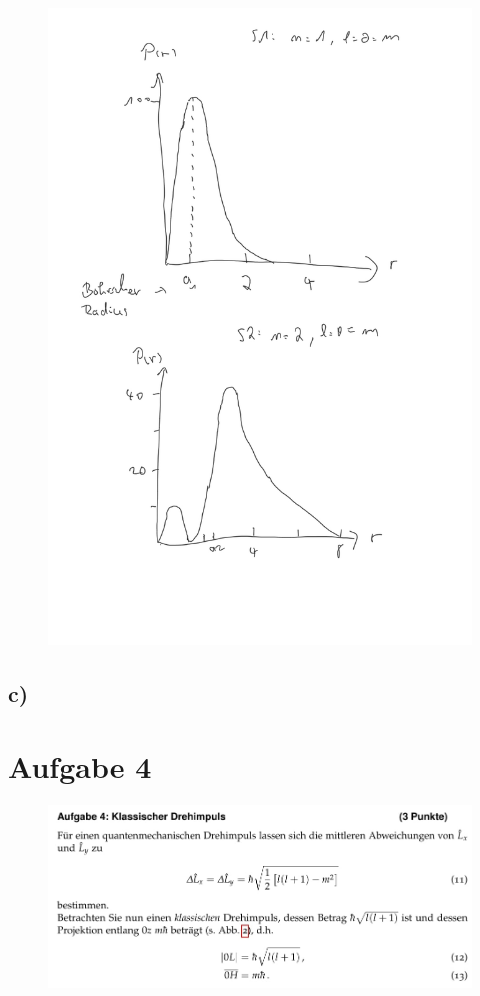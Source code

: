     \begin{figure}[H]
        \centering
        \includegraphics[width=\textwidth]{images/Skizze3b.jpg}
        \label{fig:7}
    \end{figure}

    \subsection{c)}

\section{Aufgabe 4}

    \begin{figure}[H]
        \centering
        \includegraphics[width=\textwidth]{images/Aufgabe4a.jpg}
        \label{fig:8}
    \end{figure}

